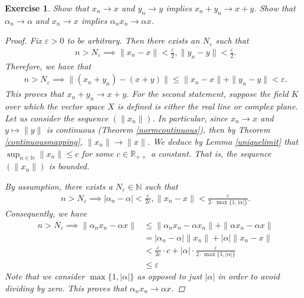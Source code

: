 \documentclass[11pt]{article}
\theoremstyle{mystyle}
\newtheorem{protoexer}{Exercise}[section]
\newenvironment{exer}
{\colorlet{shadecolor}{blue!15}\begin{shaded}\begin{protoexer}}
{\end{protoexer}\end{shaded}}
\newcommand{\0}{\mathbf{0}}
\begin{document}
\begin{exer}
Show that $x_n \longrightarrow x$ and $y_n \longrightarrow y$ implies $x_n + y_n \longrightarrow x + y$. Show that $\alpha_n \longrightarrow \alpha$ and $x_n \longrightarrow x$ implies $\alpha_n x_n \longrightarrow \alpha x$.
\begin{proof}
Fix $\varepsilon > 0$ to be arbitrary.\newline
Then there exists an $N_{\varepsilon}$ such that
\begin{align*}
    n >  N_{\varepsilon} \implies \|x_n - x\| < \frac{\varepsilon}{2}, \|y_n - y\| < \frac{\varepsilon}{2}.
\end{align*}
Therefore, we have that
\begin{align*}
    n >  N_{\varepsilon} \implies \| (x_n + y_n) - (x + y)\| \leq \| x_n - x\| + \|y_n - y\| < \varepsilon.
\end{align*}
This proves that $x_n + y_n \longrightarrow x + y$.\newline
For the second statement, suppose the field $K$ over which the vector space $X$ is defined is either the real line or complex plane. Let us consider the sequence $(\|x_n\|)$. In particular, since $x_n \longrightarrow x$ and $y \mapsto \|y\|$ is continuous (Theorem \ref{normcontinuous}), then by Theorem \ref{continuousmapping}, $\|x_n\| \longrightarrow \|x\|$. We deduce by Lemma \ref{uniquelimit} that $\sup_{n \in \mathbb{N}} \|x_n\| \leq c$ for some $c \in \mathbb{R}_{++}$ a constant. That is, the sequence $(\|x_n\|)$ is bounded. 

By assumption, there exists a $N_{\varepsilon} \in \mathbb{N}$ such that
\begin{align*}
    n > N_{\varepsilon} \implies |\alpha_n - \alpha| < \frac{\varepsilon}{2c}, \|x_n - x\| < \frac{\varepsilon}{2 \cdot \max\{1, |\alpha|\}}.
\end{align*}
Consequently, we have
\begin{align*}
    n > N_{\varepsilon} \implies \|\alpha_n x_n - \alpha x\| &\leq \|\alpha_n x_n - \alpha x_n\| + \| \alpha x_n - \alpha x\|\\
    &= |\alpha_n - \alpha| \|x_n\| + |\alpha| \|x_n - x\|\\
    &< \frac{\varepsilon}{2c} \cdot  c + |\alpha| \cdot \frac{\varepsilon}{2 \cdot \max\{1, |\alpha|\}}\\
    &\leq \varepsilon
\end{align*}
Note that we consider $\max\{1, |\alpha|\}$ as opposed to just $|\alpha|$ in order to avoid dividing by zero. This proves that $\alpha_n x_n \longrightarrow \alpha x$.
\end{proof}
\end{exer}
\end{document}
